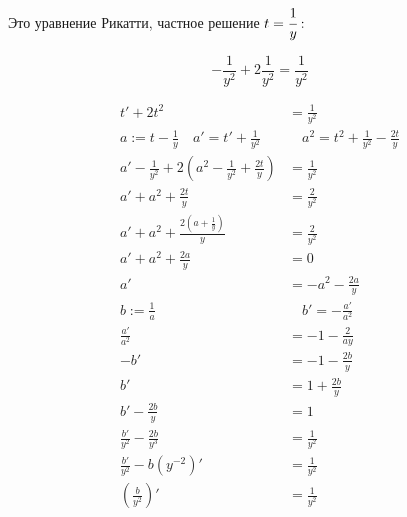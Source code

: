Это уравнение Рикатти, частное решение $t=\cfrac{1}{y}:$

\[-\frac{1}{y^2} + 2\frac{1}{y^2} = \frac{1}{y^2}\]

\begin{align*}
    t' + 2t^2                                                             & = \frac{1}{y^2}                                \\
    a := t - \frac{1}{y} \quad a' = t' + \frac{1}{y^2}                    & \quad a^2 = t^2 + \frac{1}{y^2} - \frac{2t}{y} \\
    a' - \frac{1}{y^2} + 2\left(a^2 - \frac{1}{y^2} + \frac{2t}{y}\right) & = \frac{1}{y^2}                                \\
    a' + a^2 + \frac{2t}{y}                                               & = \frac{2}{y^2}                                \\
    a' + a^2 + \frac{2\left(a + \frac{1}{y}\right)}{y}                    & = \frac{2}{y^2}                                \\
    a' + a^2 + \frac{2a}{y}                                               & = 0                                            \\
    a'                                                                    & = - a^2 - \frac{2a}{y} \tag{2}                 \\
    b := \frac{1}{a}                                                      & \quad b' = -\frac{a'}{a^2}                     \\
    \frac{a'}{a^2}                                                        & = -1 - \frac{2}{ay}                            \\
    -b'                                                                   & = -1 - \frac{2b}{y}                            \\
    b'                                                                    & = 1 + \frac{2b}{y}                             \\
    b' - \frac{2b}{y}                                                     & = 1                                            \\
    \frac{b'}{y^2} - \frac{2b}{y^3}                                       & = \frac{1}{y^2}                                \\
    \frac{b'}{y^2} - b(y^{-2})'                                           & = \frac{1}{y^2}                                \\
    \left(\frac{b}{y^2}\right)'                                           & = \frac{1}{y^2}                                \\

\end{align*}
